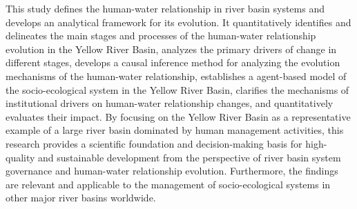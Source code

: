 \begin{eabstract}
  This study defines the human-water relationship in river basin systems and develops an analytical framework for its evolution. It quantitatively identifies and delineates the main stages and processes of the human-water relationship evolution in the Yellow River Basin, analyzes the primary drivers of change in different stages, develops a causal inference method for analyzing the evolution mechanisms of the human-water relationship, establishes a agent-based model of the socio-ecological system in the Yellow River Basin, clarifies the mechanisms of institutional drivers on human-water relationship changes, and quantitatively evaluates their impact.
  By focusing on the Yellow River Basin as a representative example of a large river basin dominated by human management activities, this research provides a scientific foundation and decision-making basis for high-quality and sustainable development from the perspective of river basin system governance and human-water relationship evolution. Furthermore, the findings are relevant and applicable to the management of socio-ecological systems in other major river basins worldwide.

\end{eabstract}


